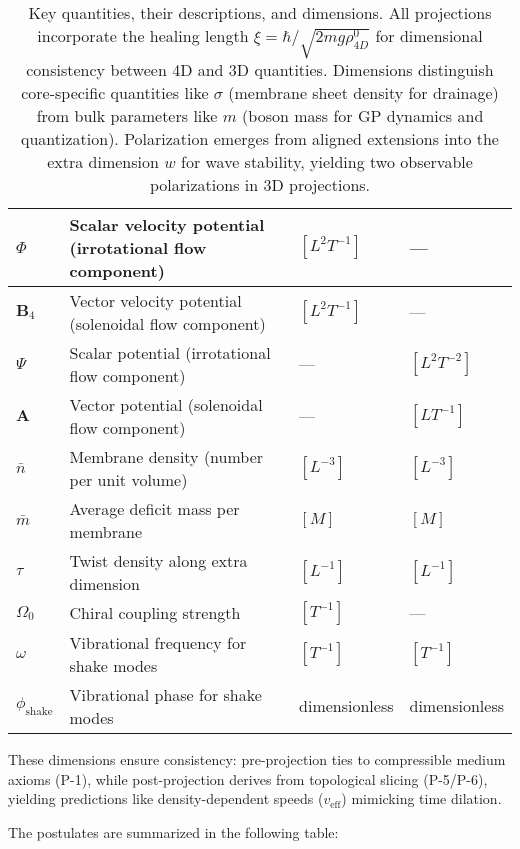 \begin{table}[H]
\begin{tabularx}{\textwidth}{|l|Y|l|l|}
\hline
$\Phi$ & Scalar velocity potential (irrotational flow component) & $[L^2 T^{-1}]$ & --- \\
\hline
$\mathbf{B}_4$ & Vector velocity potential (solenoidal flow component) & $[L^2 T^{-1}]$ & --- \\
\hline
$\Psi$ & Scalar potential (irrotational flow component) & --- & $[L^2 T^{-2}]$ \\
\hline
$\mathbf{A}$ & Vector potential (solenoidal flow component) & --- & $[L T^{-1}]$ \\
\hline
$\bar{n}$ & Membrane density (number per unit volume) & $[L^{-3}]$ & $[L^{-3}]$ \\
\hline
$\bar{m}$ & Average deficit mass per membrane & $[M]$ & $[M]$ \\
\hline
$\tau$ & Twist density along extra dimension & $[L^{-1}]$ & $[L^{-1}]$ \\
\hline
$\Omega_0$ & Chiral coupling strength & $[T^{-1}]$ & --- \\
\hline
$\omega$ & Vibrational frequency for shake modes & $[T^{-1}]$ & $[T^{-1}]$ \\
\hline
$\phi_{\text{shake}}$ & Vibrational phase for shake modes & dimensionless & dimensionless \\
\hline
\end{tabularx}
\caption{Key quantities, their descriptions, and dimensions. All projections incorporate the healing length $\xi = \hbar / \sqrt{2 m g \rho_{4D}^0}$ for dimensional consistency between 4D and 3D quantities. Dimensions distinguish core-specific quantities like $\sigma$ (membrane sheet density for drainage) from bulk parameters like $m$ (boson mass for GP dynamics and quantization). Polarization emerges from aligned extensions into the extra dimension $w$ for wave stability, yielding two observable polarizations in 3D projections.}
\label{tab:notation}
\end{table}

These dimensions ensure consistency: pre-projection ties to compressible medium axioms (P-1), while post-projection derives from topological slicing (P-5/P-6), yielding predictions like density-dependent speeds ($v_{\text{eff}}$) mimicking time dilation.

The postulates are summarized in the following table:

